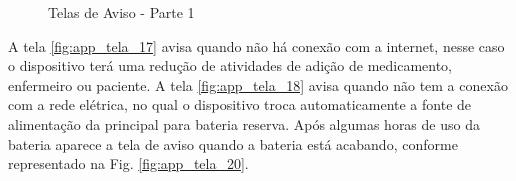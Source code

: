 \begin{apendicesenv}
\begin{figure}[H]
    \centering
    \caption{Telas de Aviso - Parte 1 }\label{fig:telas_14_15_16}
\end{figure}

A tela \ref{fig:app_tela_17} avisa quando não há conexão com a internet, nesse caso o dispositivo terá uma redução de atividades de adição de medicamento, enfermeiro ou paciente. A tela \ref{fig:app_tela_18} avisa quando não tem a conexão com a rede elétrica, no qual o dispositivo troca automaticamente a fonte de alimentação da principal para bateria reserva. Após algumas horas de uso da bateria aparece a tela de aviso quando a bateria está acabando, conforme representado na Fig. \ref{fig:app_tela_20}.


\end{apendicesenv}
